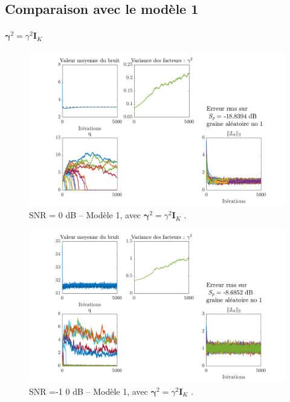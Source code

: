 \documentclass[ 12pt]{article}
\begin{document}
\newpage
\subsection{Comparaison avec le modèle 1}
\paragraph{$\bm{\gamma}^2 = \gamma^2\bm{I}_K$}
\begin{figure}[H]
	\centering
	\includegraphics[width=\textwidth]{ToyCase/modele1.png}	
	\caption{SNR = 0 dB  -- Modèle 1, avec $\bm{\gamma}^2 = \gamma^2\bm{I}_K$ .}
\end{figure}
\begin{figure}[H]
	\centering
	\includegraphics[width=\textwidth]{ToyCase/modele1_snrm10db.png}	
	\caption{SNR =-1 0 dB  -- Modèle 1, avec $\bm{\gamma}^2 = \gamma^2\bm{I}_K$ .}
\end{figure}
\end{document}
